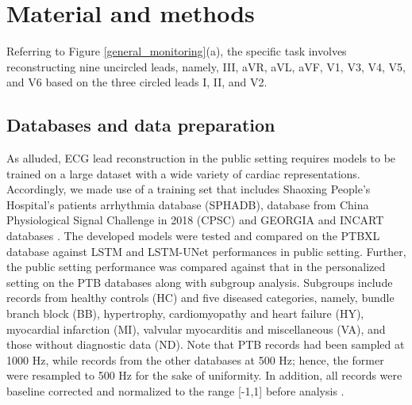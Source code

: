 \documentclass[conference]{IEEEtran}
\begin{document}


 
\section{Material and methods}

Referring to Figure \ref{general_monitoring}(a), the specific task involves reconstructing nine uncircled leads, namely, III, aVR, aVL, aVF, V1, V3, V4, V5, and V6 based on the three circled leads I, II, and V2.

\subsection{Databases and data preparation}

As alluded, ECG lead reconstruction in the public setting requires models to be trained on a large dataset with a wide variety of cardiac representations. Accordingly, we made use of a training set that includes Shaoxing People’s Hospital’s patients arrhythmia database (SPHADB), database from China Physiological Signal Challenge in 2018 (CPSC) and GEORGIA and INCART databases \cite{physionet}. The developed models were tested and compared on the PTBXL database against LSTM and LSTM-UNet performances in public setting. 
Further, the public setting performance was compared against that in the personalized setting on the PTB databases along with subgroup analysis. Subgroups include records from healthy controls (HC) and five diseased categories, namely, bundle branch block (BB), hypertrophy, cardiomyopathy and heart failure (HY), myocardial infarction (MI), valvular myocarditis and miscellaneous (VA), and those without diagnostic data (ND). Note that PTB records had been sampled at 1000 Hz, while records from the other databases at 500 Hz; hence, the former were resampled to 500 Hz for the sake of uniformity. In addition, all records were baseline corrected and normalized to the range [-1,1] before analysis \cite{sandeep}.
\end{document}
